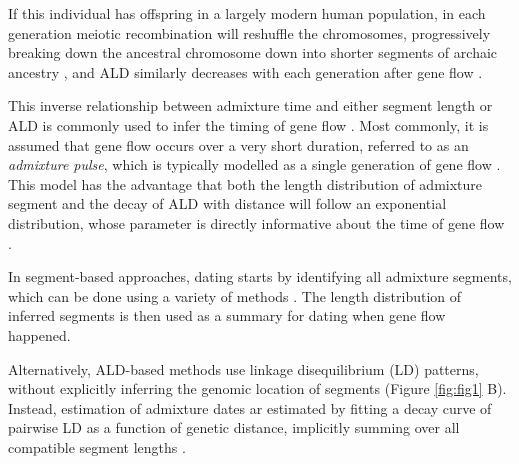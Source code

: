 \documentclass[11pt]{article}
\begin{document}
If this individual has offspring in a largely modern human population, in each generation meiotic recombination will reshuffle the chromosomes, progressively breaking down the ancestral chromosome down into shorter segments of archaic ancestry \citep{falush_inference_2003, gravel_population_2012,liang_lengths_2014}, and ALD similarly decreases with each generation after gene flow \citep{chakraborty_admixture_1988,stephens_mapping_1994,wall_detecting_2000}.


This inverse relationship between admixture time and either segment length or ALD is commonly used to infer the timing of gene flow \citep{pool_inference_2009,moorjani_history_2011,pugach_dating_2011,gravel_population_2012,sankararaman_date_2012,loh_inferring_2013,hellenthal_genetic_2014,liang_lengths_2014,sankararaman_combined_2016,pugach_gateway_2018,jacobs_multiple_2019}. Most commonly, it is assumed that gene flow occurs over a very short duration, referred to as an \textit{admixture pulse}, which is typically modelled as a single generation of gene flow \citep[e.g][]{moorjani_history_2011}. This model has the advantage that both the length distribution of admixture segment and the decay of ALD with distance will follow an exponential distribution, whose parameter is directly informative about the time of gene flow \citep{pool_inference_2009, liang_lengths_2014, gravel_population_2012}.

In segment-based approaches, dating starts by identifying all admixture segments, which can be done using a variety of methods \citep{seguin_orlando_paleogenomics_2014,sankararaman_combined_2016,vernot_excavating_2016,racimo_signatures_2017,skov_detecting_2018}. The length distribution of inferred segments is then used as a summary for dating when gene flow happened.

Alternatively, ALD-based methods use linkage disequilibrium (LD) patterns, without explicitly inferring the genomic location of segments \citep{chimusa_dating_2018} (Figure \ref{fig:fig1} B). Instead, estimation of admixture dates ar estimated by fitting a decay curve of pairwise LD as a function of genetic distance, implicitly summing over all compatible segment lengths \citep{moorjani_history_2011,loh_inferring_2013}. 
\end{document}

